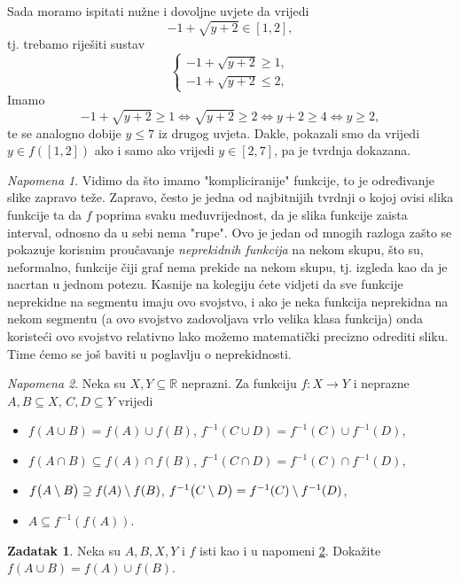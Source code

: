 \documentclass{book}
\let\originalleft\left
\let\originalright\right
\renewcommand{\left}{\mathopen{}\mathclose\bgroup\originalleft}
\renewcommand{\right}{\aftergroup\egroup\originalright}
\renewenvironment{proof}{%
    \vspace{-\parskip}\begin{oldproof}%
    }{%
    \end{oldproof}%
}
\theoremstyle{definition}
\theoremstyle{definition}
\newtheorem{exercise}{Zadatak}
\theoremstyle{remark}
\newtheorem{remark}{Napomena}
\begin{document}
\begin{proof}[Rješenje]
Sada moramo ispitati nužne i dovoljne uvjete da vrijedi $$-1+\sqrt{y+2}\in [1, 2],$$
tj. trebamo riješiti sustav
$$\begin{cases}
-1+\sqrt{y+2}\geq 1,\\
-1+\sqrt{y+2}\leq 2,
\end{cases}$$
Imamo
$$-1+\sqrt{y+2}\geq 1\Leftrightarrow \sqrt{y+2}\geq 2\Leftrightarrow y+2\geq 4\Leftrightarrow y\geq 2,$$
te se analogno dobije $y\leq 7$ iz drugog uvjeta. Dakle, pokazali smo da vrijedi $y\in f([1, 2])$ ako i samo ako vrijedi $y\in [2, 7]$, pa je tvrdnja dokazana.
\end{proof}
\begin{remark}
Vidimo da što imamo "kompliciranije" funkcije, to je određivanje slike zapravo teže. Zapravo, često je jedna od najbitnijih tvrdnji o kojoj ovisi slika funkcije ta da $f$ poprima svaku međuvrijednost, da je slika funkcije zaista interval, odnosno da u sebi nema "rupe". Ovo je jedan od mnogih razloga zašto se pokazuje korisnim proučavanje \textit{neprekidnih funkcija} na nekom skupu, što su, neformalno, funkcije čiji graf nema prekide na nekom skupu, tj. izgleda kao da je nacrtan u jednom potezu. Kasnije na kolegiju ćete vidjeti da sve funkcije neprekidne na segmentu imaju ovo svojstvo, i ako je neka funkcija neprekidna na nekom segmentu (a ovo svojstvo zadovoljava vrlo velika klasa funkcija) onda koristeći ovo svojstvo relativno lako možemo matematički precizno odrediti sliku. Time ćemo se još baviti u poglavlju o neprekidnosti.
\end{remark}
\newpage
\begin{remark}
\label{imset}
Neka su $X,Y\subseteq \mathbb{R}$ neprazni. Za funkciju $f : X\to Y$ i neprazne $A, B\subseteq X$, $C, D\subseteq Y$ vrijedi
\begin{itemize}
\item $f(A\cup B)=f(A)\cup f(B)$, \hspace{0.5cm} $f^{-1}(C\cup D)=f^{-1}(C)\cup f^{-1}(D)$,
\item $f(A\cap B)\subseteq f(A)\cap f(B)$, \hspace{0.5cm} $f^{-1}(C\cap D)=f^{-1}(C)\cap f^{-1}(D)$,
\item $f\left(A\setminus B\right)\supseteq f(A)\setminus f(B)$, \hspace{0.5cm} $f^{-1}\left(C\setminus D\right)=f^{-1}(C)\setminus f^{-1}(D)$,
\item $A\subseteq f^{-1}(f(A))$.
\end{itemize}
\end{remark}
\begin{exercise}
Neka su $A, B, X, Y$ i $f$ isti kao i u napomeni \ref{imset}. Dokažite $f(A\cup B)=f(A)\cup f(B)$.
\end{exercise}
\end{document}
